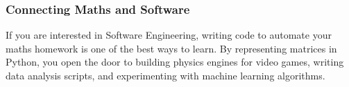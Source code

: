 \subsubsection*{Connecting Maths and Software}

If you are interested in Software Engineering, writing code to automate your maths homework is one of the best ways to learn. By representing matrices in Python, you open the door to building physics engines for video games, writing data analysis scripts, and experimenting with machine learning algorithms.
